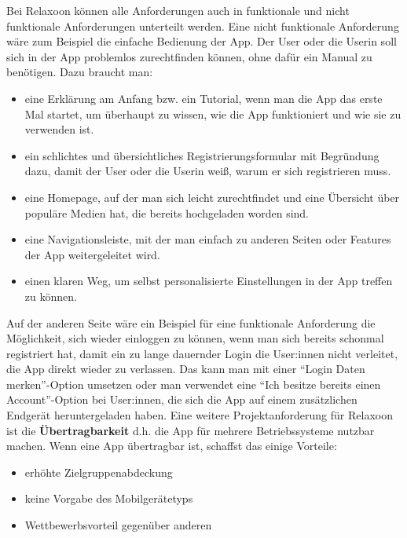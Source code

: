 Bei Relaxoon können alle Anforderungen auch in funktionale und nicht funktionale Anforderungen unterteilt werden.
Eine nicht funktionale Anforderung wäre zum Beispiel die einfache Bedienung der App. Der User oder die Userin
soll sich in der App problemlos zurechtfinden können, ohne dafür ein Manual zu benötigen. Dazu braucht man:
\begin{itemize}
      \item eine Erklärung am Anfang bzw. ein Tutorial, wenn man die App das erste Mal startet, um überhaupt 
      zu wissen, wie die App funktioniert und wie sie zu verwenden ist.
      \item ein schlichtes und übersichtliches Registrierungsformular mit Begründung dazu, damit der User oder
      die Userin weiß, warum er sich registrieren muss.
      \item eine Homepage, auf der man sich leicht zurechtfindet und eine Übersicht über populäre Medien hat, die
      bereits hochgeladen worden sind.
      \item eine Navigationsleiste, mit der man einfach zu anderen Seiten oder Features der App weitergeleitet wird.
      \item einen klaren Weg, um selbst personalisierte Einstellungen in der App treffen zu können. 
\end{itemize}

Auf der anderen Seite wäre ein Beispiel für eine funktionale Anforderung die Möglichkeit, sich wieder einloggen zu
können, wenn man sich bereits schonmal registriert hat, damit ein zu lange dauernder Login die User:innen
nicht verleitet, die App direkt wieder zu verlassen. Das kann man mit einer "`Login Daten merken"'-Option umsetzen
oder man verwendet eine "`Ich besitze bereits einen Account"'-Option bei User:innen, die sich die App auf einem
zusätzlichen Endgerät heruntergeladen haben. Eine weitere Projektanforderung für Relaxoon ist die
\textbf{Übertragbarkeit} d.h. die App für mehrere Betriebssysteme nutzbar machen. Wenn eine App übertragbar ist,
schaffst das einige Vorteile:
\begin{itemize}
      \item erhöhte Zielgruppenabdeckung
      \item keine Vorgabe des Mobilgerätetyps
      \item Wettbewerbsvorteil gegenüber anderen
\end{itemize}